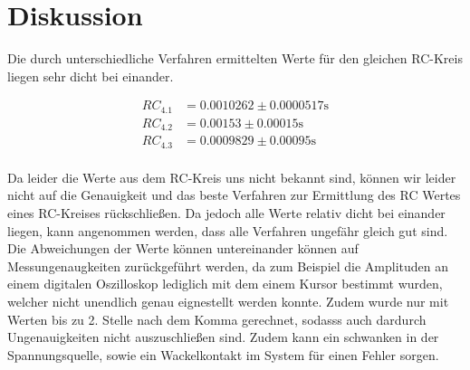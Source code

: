 \section{Diskussion}
\label{sec:Diskussion}
Die durch unterschiedliche Verfahren ermittelten Werte für den gleichen RC-Kreis liegen sehr dicht bei einander. 

\begin{align*}
    RC_\text{4.1} &= 0.0010262 \pm 0.0000517 \si{\second}\\
    RC_\text{4.2} &= 0.00153 \pm 0.00015 \si{\second}\\
    RC_\text{4.3} &= 0.0009829 \pm 0.00095 \si{\second}\\
\end{align*}

\noindent
Da leider die Werte aus dem RC-Kreis uns nicht bekannt sind, können wir leider
nicht auf die Genauigkeit und das beste Verfahren zur Ermittlung des RC Wertes eines RC-Kreises rückschließen. Da jedoch alle Werte relativ dicht bei einander liegen, kann angenommen werden,
dass alle Verfahren ungefähr gleich gut sind. 
\noindent
Die Abweichungen der Werte können untereinander können auf Messungenaugkeiten zurückgeführt werden, da zum Beispiel die Amplituden an einem digitalen Oszilloskop lediglich mit dem einem Kursor 
bestimmt wurden, welcher nicht unendlich genau eignestellt werden konnte. Zudem wurde nur mit Werten bis zu 2. Stelle nach dem Komma gerechnet, sodasss auch dardurch Ungenauigkeiten nicht auszuschließen sind.
Zudem kann ein schwanken in der Spannungsquelle, sowie ein Wackelkontakt im System für einen Fehler sorgen.